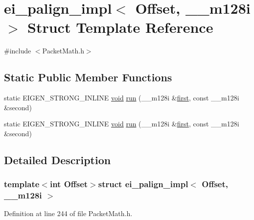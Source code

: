\hypertarget{structei__palign__impl_3_01_offset_00_01____m128i_01_4}{\section{ei\-\_\-palign\-\_\-impl$<$ Offset, \-\_\-\-\_\-m128i $>$ Struct Template Reference}
\label{structei__palign__impl_3_01_offset_00_01____m128i_01_4}
}


{\ttfamily \#include $<$Packet\-Math.\-h$>$}

\subsection*{Static Public Member Functions}
\begin{DoxyCompactItemize}
\item 
static E\-I\-G\-E\-N\-\_\-\-S\-T\-R\-O\-N\-G\-\_\-\-I\-N\-L\-I\-N\-E \hyperlink{group___u_a_v_objects_plugin_ga444cf2ff3f0ecbe028adce838d373f5c}{void} \hyperlink{structei__palign__impl_3_01_offset_00_01____m128i_01_4_abde4648942c0975e0a3897cb474c799e}{run} (\-\_\-\-\_\-m128i \&\hyperlink{glext_8h_a970a385f6f880f2b620451db4ca4299a}{first}, const \-\_\-\-\_\-m128i \&second)
\item 
static E\-I\-G\-E\-N\-\_\-\-S\-T\-R\-O\-N\-G\-\_\-\-I\-N\-L\-I\-N\-E \hyperlink{group___u_a_v_objects_plugin_ga444cf2ff3f0ecbe028adce838d373f5c}{void} \hyperlink{structei__palign__impl_3_01_offset_00_01____m128i_01_4_abde4648942c0975e0a3897cb474c799e}{run} (\-\_\-\-\_\-m128i \&\hyperlink{glext_8h_a970a385f6f880f2b620451db4ca4299a}{first}, const \-\_\-\-\_\-m128i \&second)
\end{DoxyCompactItemize}


\subsection{Detailed Description}
\subsubsection*{template$<$int Offset$>$struct ei\-\_\-palign\-\_\-impl$<$ Offset, \-\_\-\-\_\-m128i $>$}



Definition at line 244 of file Packet\-Math.\-h.



